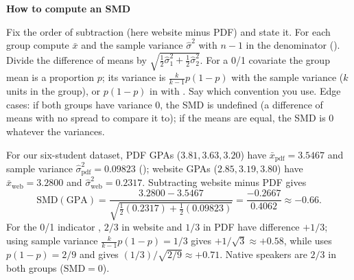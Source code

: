\documentclass[10pt]{scrartcl}
\newenvironment{howto}[1]{\begin{mdframed}[style=howtostyle]{\color{NavyBlue}\textbf{#1}}\par\vspace{2pt}}{\end{mdframed}}
\begin{document}
\begin{howto}{How to compute an SMD}
\begin{steps}
  \ii Fix the order of subtraction (here website minus PDF) and state it.
  \ii For each group compute $\bar x$ and the sample variance $\hat\sigma^2$ with $n-1$ in the denominator ().
  \ii Divide the difference of means by $\sqrt{\tfrac12\hat\sigma_1^2 + \tfrac12\hat\sigma_2^2}$.
  \ii For a 0/1 covariate the group mean is a proportion $p$; its variance is $\frac{k}{k-1}p(1-p)$ with the sample variance ($k$ units in the group), or $p(1-p)$ in  with . Say which convention you use.
  \ii Edge cases: if both groups have variance $0$, the SMD is undefined (a difference of means with no spread to compare it to); if the means are equal, the SMD is $0$ whatever the variances.
\end{steps}
\end{howto}

For our six-student dataset, PDF GPAs ($3.81, 3.63, 3.20$) have $\bar x_{\text{pdf}} = 3.5467$ and sample variance $\hat\sigma^2_{\text{pdf}} = 0.09823$ (); website GPAs ($2.85, 3.19, 3.80$) have $\bar x_{\text{web}} = 3.2800$ and $\hat\sigma^2_{\text{web}} = 0.2317$. Subtracting website minus PDF gives
\[
  \mathrm{SMD}(\text{GPA}) = \frac{3.2800 - 3.5467}{\sqrt{\frac{1}{2}(0.2317) + \frac{1}{2}(0.09823)}} = \frac{-0.2667}{0.4062} \approx -0.66.
\]
For the 0/1 indicator , $2/3$ in website and $1/3$ in PDF have difference $+1/3$; using sample variance $\frac{k}{k-1}p(1-p) = 1/3$ gives $+1/\sqrt{3} \approx +0.58$, while  uses $p(1-p) = 2/9$ and gives $(1/3)/\sqrt{2/9} \approx +0.71$. Native speakers are $2/3$ in both groups ($\mathrm{SMD} = 0$).
\end{document}
